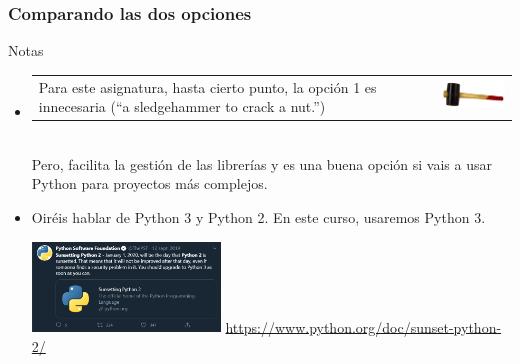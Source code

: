 \documentclass[9pt]{beamer}
\begin{document}
\begin{frame}
  \frametitle{Comparando las dos opciones}
  \begin{block}{Notas}
    \begin{itemize}
    \item       \begin{tabular}[h]{b{5cm}m{3cm}}
                  \parbox[t]{5cm}{ Para este asignatura, hasta cierto
                  punto, la opción 1 es innecesaria (``a sledgehammer to
                  crack a nut.'')}&
                                 \includegraphics[width=3cm]{sledgehammer-nut.png}
                                 
                \end{tabular}\\
                Pero, facilita la gestión de las librerías y es una
                buena opción si vais a usar Python para proyectos más complejos.
                \pause
              \item Oiréis hablar de Python 3 y Python 2. En este
                curso, usaremos Python 3.\\
                \begin{center}
                  \includegraphics[width=5cm]{sunsetting_python_2.png}
                  \href{https://www.python.org/doc/sunset-python-2/}{https://www.python.org/doc/sunset-python-2/}
                \end{center}

              \end{itemize}
            \end{block}

          \end{frame}
\end{document}
